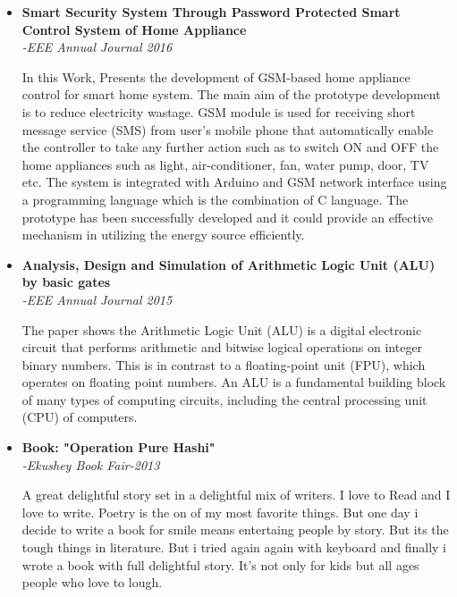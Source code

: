 \documentclass[11pt,a4paper,sans]{moderncv}        %
\begin{document}
\begin{itemize}

\item{\textbf{Smart Security System Through Password Protected Smart Control System of Home Appliance} \textit{\\-EEE Annual Journal 2016}

\vspace{3pt}

\small{In this Work, Presents the development of GSM-based home appliance control for smart home system. The main aim of the prototype development is to reduce electricity wastage.
GSM module is used for receiving  short message  service (SMS) from user’s mobile phone  that automatically enable the controller to take any further action such as to switch ON and OFF the home appliances such as light, air-conditioner, fan, water pump, door, TV etc. The system is integrated with Arduino and GSM network interface using a programming language which is the combination of C language.
The prototype has been successfully developed and it could provide an effective mechanism in utilizing the energy source efficiently.}}

\vspace{6pt}

\item{\textbf{Analysis, Design and Simulation of Arithmetic Logic Unit (ALU) by basic gates} \textit{\\-EEE Annual Journal 2015}

\vspace{3pt}

\small{The paper shows the Arithmetic Logic Unit (ALU) is a digital electronic circuit that performs arithmetic and bitwise logical operations on integer binary numbers. This is in contrast to a floating-point unit (FPU), which operates on floating point numbers. An ALU is a fundamental building block of many types of computing circuits, including the central processing unit (CPU) of computers.}}

\vspace{6pt}

\item{\textbf{Book: "Operation Pure Hashi"} \textit{\\-Ekushey Book Fair-2013}

\vspace{3pt}

\small{A great delightful story set in a delightful mix of writers. I love to Read and I love to write. Poetry is the on of my most favorite things. But one day i decide to write a book for smile means entertaing people by story. But its the tough things in literature. But i tried again again with keyboard and finally i wrote a book with full delightful story. It's not only for kids but all ages people who love to lough.}}

\end{itemize}
\end{document}

